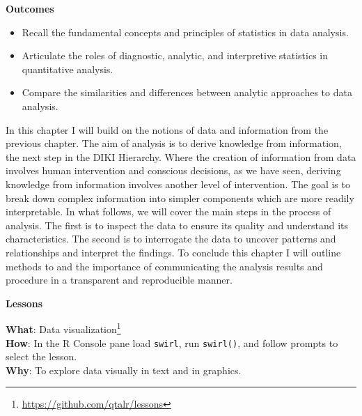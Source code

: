 \documentclass[
  letterpaper,
  DIV=11,
  numbers=noendperiod]{scrreport}
\providecommand{\tightlist}{%
  \setlength{\itemsep}{0pt}\setlength{\parskip}{0pt}}\usepackage{longtable,booktabs,array}
\theoremstyle{definition}
\theoremstyle{remark}
\DeclareRobustCommand{\href}[2]{#2\footnote{\url{#1}}}
\begin{document}
\begin{tcolorbox}[enhanced jigsaw, breakable, colback=white, rightrule=.15mm, arc=.35mm, left=2mm, toprule=.15mm, leftrule=.75mm, bottomrule=.15mm, opacityback=0]

\textbf{ Outcomes}

\begin{itemize}
\tightlist
\item
  Recall the fundamental concepts and principles of statistics in data
  analysis.
\item
  Articulate the roles of diagnostic, analytic, and interpretive
  statistics in quantitative analysis.
\item
  Compare the similarities and differences between analytic approaches
  to data analysis.
\end{itemize}

\end{tcolorbox}

In this chapter I will build on the notions of data and information from
the previous chapter. The aim of analysis is to derive knowledge from
information, the next step in the DIKI Hierarchy. Where the creation of
information from data involves human intervention and conscious
decisions, as we have seen, deriving knowledge from information involves
another level of intervention. The goal is to break down complex
information into simpler components which are more readily
interpretable. In what follows, we will cover the main steps in the
process of analysis. The first is to inspect the data to ensure its
quality and understand its characteristics. The second is to interrogate
the data to uncover patterns and relationships and interpret the
findings. To conclude this chapter I will outline methods to and the
importance of communicating the analysis results and procedure in a
transparent and reproducible manner.

\begin{tcolorbox}[enhanced jigsaw, breakable, colback=white, rightrule=.15mm, arc=.35mm, left=2mm, toprule=.15mm, leftrule=.75mm, bottomrule=.15mm, opacityback=0]

\textbf{ Lessons}

\textbf{What}: \href{https://github.com/qtalr/lessons}{Data
visualization}\\
\textbf{How}: In the R Console pane load \texttt{swirl}, run
\texttt{swirl()}, and follow prompts to select the lesson.\\
\textbf{Why}: To explore data visually in text and in graphics.

\end{tcolorbox}
\end{document}

